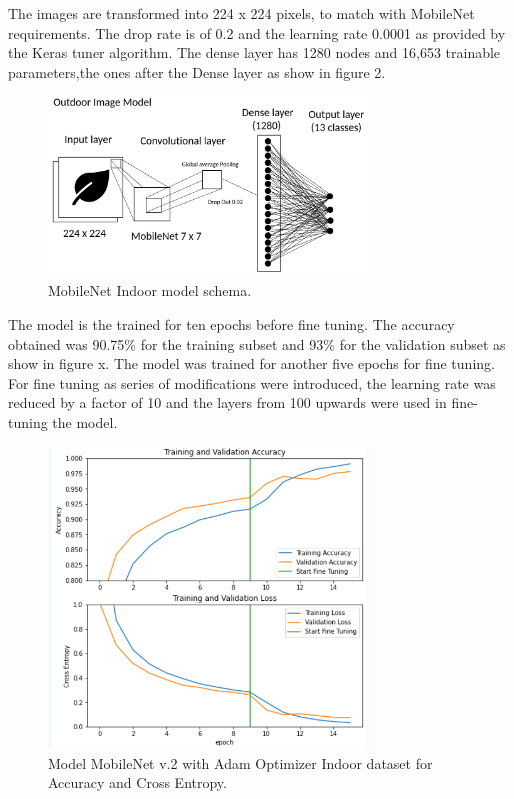\documentclass[conference]{IEEEtran}
\begin{document}
The images are transformed into 224 x 224 pixels, to match with MobileNet requirements. The drop rate is of 0.2 and the learning rate 0.0001 as provided by the Keras tuner algorithm. The dense layer has 1280 nodes and 16,653 trainable parameters,the ones after the Dense layer as show in figure 2.
\begin{figure}[htbp]
\centerline{\includegraphics[width=8.5cm]{ModelOutdoorsMobileNet.png}}
\caption{MobileNet Indoor model schema.}
\label{fig}
\end{figure}
    The model is the trained for ten epochs before fine tuning. The accuracy obtained was 90.75\% for the training subset and 93\% for the validation subset as show in figure x. The model was trained for another five epochs for fine tuning. For fine tuning as series of modifications were introduced, the learning rate was reduced by a factor of 10 and the layers from 100 upwards were used in fine-tuning the model. 
    
\begin{figure}[htbp]
\centerline{\includegraphics[width=8.5cm]{ModelIndoorsMobileNetEpochsAccuracychart.png}}
\caption{Model MobileNet v.2 with Adam Optimizer Indoor dataset for Accuracy and Cross Entropy.}
\label{fig}
\end{figure}
\end{document}
